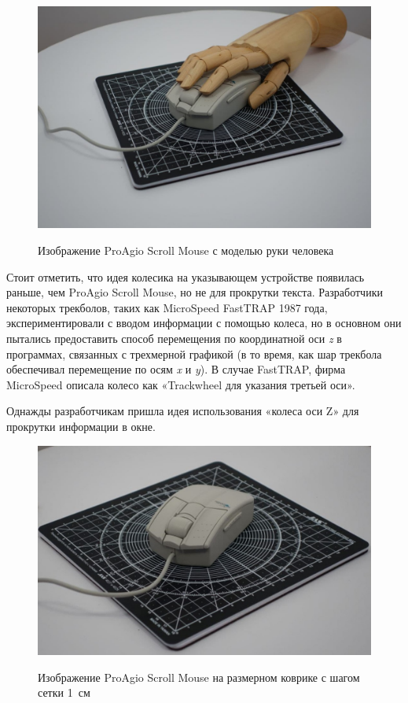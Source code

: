 \documentclass[11pt, a4paper]{article}
\begin{document}
    \begin{figure}[h]
        \centering
    \includegraphics[scale=0.3]{1995_pro_agio_scroll_mouse/4.2.jpg}
        \label{quad-ruka}
        \caption{Изображение ProAgio Scroll Mouse с моделью руки человека}
    \end{figure}
    Стоит отметить, что идея колесика на указывающем устройстве появилась раньше, чем ProAgio Scroll Mouse, но не для прокрутки текста. Разработчики некоторых трекболов, таких как MicroSpeed  FastTRAP 1987 года, экспериментировали с вводом информации с помощью колеса, но в основном они пытались предоставить способ перемещения по координатной оси \textit{z} в программах, связанных с трехмерной графикой (в то время, как шар трекбола обеспечивал перемещение по осям \textit{x} и \textit{y}). В случае FastTRAP, фирма MicroSpeed описала колесо как «Trackwheel для указания третьей оси».
    
    Однажды разработчикам пришла идея использования «колеса оси Z» для прокрутки информации в окне.

    \begin{figure}[h]
        \centering
    \includegraphics[scale=0.37]{1995_pro_agio_scroll_mouse/4.3.jpg}
        \label{quad-niz}
        \caption{Изображение ProAgio Scroll Mouse на размерном коврике с шагом сетки 1~см}
    \end{figure}
    
\end{document}

